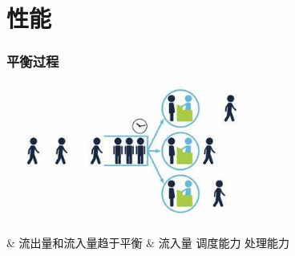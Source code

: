 \documentclass[UTF8,8pt,xcolor=dvipsnames]{beamer}
\newenvironment{myeasylist}[1]{
    \Activate
    \begin{tcolorbox}
    \begin{easylist}[#1]
} {
    \end{easylist}
    \end{tcolorbox}
    \Deactivate
}
\begin{document}
\section{性能}

\begin{frame}[fragile]
    \frametitle{平衡过程}
    \begin{center}
        \includegraphics[width=0.6\textwidth]{../imgs/queuing.jpeg}
    \end{center}

    \begin{myeasylist}{itemize}
        & 流出量和流入量趋于平衡
        & 流入量  调度能力  处理能力
    \end{myeasylist}
\end{frame}
\end{document}
